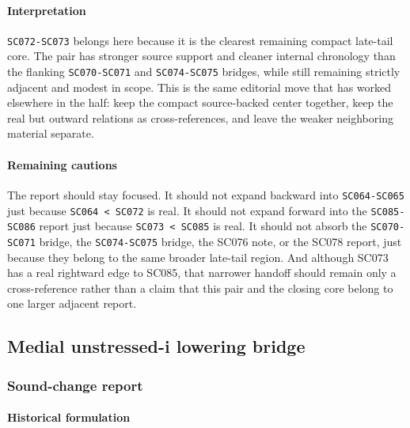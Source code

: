 \documentclass[
  british,
  a4paper,
]{article}
\begin{document}
\paragraph{Interpretation}\label{interpretation-45}

\texttt{SC072-SC073} belongs here because it is the clearest remaining
compact late-tail core. The pair has stronger source support and cleaner
internal chronology than the flanking \texttt{SC070-SC071} and
\texttt{SC074-SC075} bridges, while still remaining strictly adjacent
and modest in scope. This is the same editorial move that has worked
elsewhere in the half: keep the compact source-backed center together,
keep the real but outward relations as cross-references, and leave the
weaker neighboring material separate.

\paragraph{Remaining cautions}\label{remaining-cautions-45}

The report should stay focused. It should not expand backward into
\texttt{SC064-SC065} just because \texttt{SC064\ \textless{}\ SC072} is
real. It should not expand forward into the \texttt{SC085-SC086} report
just because \texttt{SC073\ \textless{}\ SC085} is real. It should not
absorb the \texttt{SC070-SC071} bridge, the \texttt{SC074-SC075} bridge,
the SC076 note, or the SC078 report, just because they belong to the
same broader late-tail region. And although SC073 has a real rightward
edge to SC085, that narrower handoff should remain only a
cross-reference rather than a claim that this pair and the closing core
belong to one larger adjacent report.

\subsection{Medial unstressed-i lowering
bridge}\label{medial-unstressed-i-lowering-bridge}

\subsubsection{Sound-change report}\label{sound-change-report-46}

\paragraph{Historical formulation}\label{historical-formulation-46}
\end{document}
